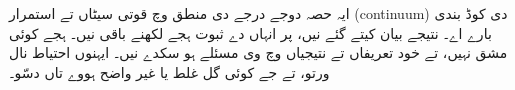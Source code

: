\documentclass[../../../include/open-logic-chapter]{subfiles}
\begin{document}

\begin{editorial}
ایہ حصہ دوجے درجے دی منطق وچ قوتی سیٹاں تے استمرار (continuum) دی کوڈ بندی بارے اے۔ نتیجے بیان کیتے گئے نیں، پر
انہاں دے ثبوت ہجے لکھنے باقی نیں۔ ہجے کوئی مشق نہیں، تے خود
تعریفاں تے نتیجیاں وچ وی مسئلے ہو سکدے نیں۔
ایہنوں احتیاط نال ورتو، تے جے کوئی گل غلط یا غیر واضح ہووے تاں دسّو۔
\end{editorial}





\OLEndChapterHook
\end{document}
